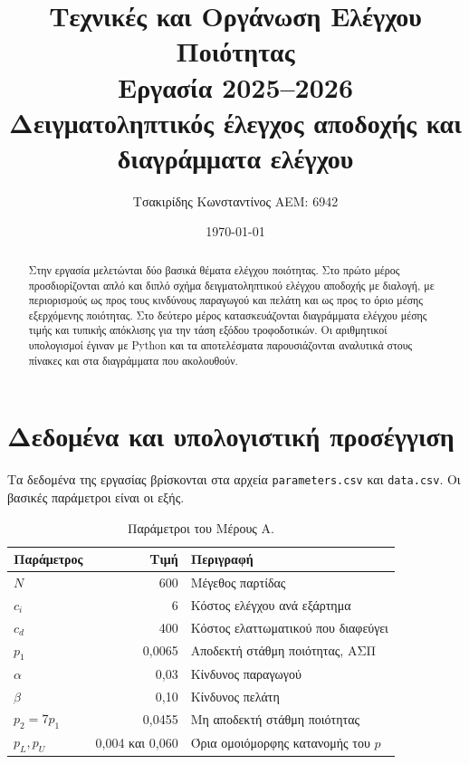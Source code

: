 \documentclass[12pt,a4paper]{article}
\title{
    \textbf{Τεχνικές και Οργάνωση Ελέγχου Ποιότητας}\\[0.25cm]
    \Large Εργασία 2025--2026\\[0.15cm]
    \large Δειγματοληπτικός έλεγχος αποδοχής και διαγράμματα ελέγχου
}
\author{Τσακιρίδης Κωνσταντίνος ΑΕΜ: 6942}
\date{\today}
\newcommand{\code}[1]{\texttt{\textenglish{#1}}}
\begin{document}
\maketitle
\thispagestyle{fancy}

\begin{abstract}
Στην εργασία μελετώνται δύο βασικά θέματα ελέγχου ποιότητας. Στο πρώτο μέρος
προσδιορίζονται απλό και διπλό σχήμα δειγματοληπτικού ελέγχου αποδοχής με
διαλογή, με περιορισμούς ως προς τους κινδύνους παραγωγού και πελάτη και ως
προς το όριο μέσης εξερχόμενης ποιότητας. Στο δεύτερο μέρος κατασκευάζονται
διαγράμματα ελέγχου μέσης τιμής και τυπικής απόκλισης για την τάση εξόδου
τροφοδοτικών. Οι αριθμητικοί υπολογισμοί έγιναν με Python και τα αποτελέσματα
παρουσιάζονται αναλυτικά στους πίνακες και στα διαγράμματα που ακολουθούν.
\end{abstract}

\tableofcontents
\newpage

\section{Δεδομένα και υπολογιστική προσέγγιση}

Τα δεδομένα της εργασίας βρίσκονται στα αρχεία \code{parameters.csv} και
\code{data.csv}. Οι βασικές παράμετροι είναι οι εξής.

\begin{table}[H]
\centering
\caption{Παράμετροι του Μέρους Α.}
\begin{tabular}{lrl}
\toprule
\textbf{Παράμετρος} & \textbf{Τιμή} & \textbf{Περιγραφή} \\
\midrule
\(N\) & 600 & Μέγεθος παρτίδας \\
\(c_i\) & 6 & Κόστος ελέγχου ανά εξάρτημα \\
\(c_d\) & 400 & Κόστος ελαττωματικού που διαφεύγει \\
\(p_1\) & 0,0065 & Αποδεκτή στάθμη ποιότητας, ΑΣΠ \\
\(\alpha\) & 0,03 & Κίνδυνος παραγωγού \\
\(\beta\) & 0,10 & Κίνδυνος πελάτη \\
\(p_2=7p_1\) & 0,0455 & Μη αποδεκτή στάθμη ποιότητας \\
\(p_L,p_U\) & 0,004 και 0,060 & Όρια ομοιόμορφης κατανομής του \(p\) \\
\bottomrule
\end{tabular}
\end{table}
\end{document}
